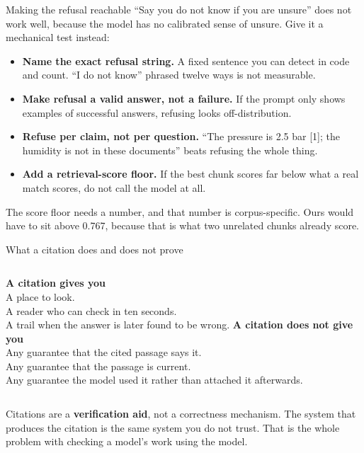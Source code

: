 \documentclass[aspectratio=169]{beamer}
\newcommand{\trapbox}[1]{%
  \begin{tcolorbox}[colback=armred!8, colframe=armred, boxrule=0.6pt, arc=2pt]
  #1
  \end{tcolorbox}}
\newcommand{\watchbox}[1]{%
  \begin{tcolorbox}[colback=armorange!12, colframe=armorange, boxrule=0.6pt, arc=2pt]
  #1
  \end{tcolorbox}}
\begin{document}
\begin{frame}{Making the refusal reachable}
  \vspace{0.3em}
  ``Say you do not know if you are unsure'' does not work well, because the model has no
  calibrated sense of unsure. Give it a mechanical test instead:

  \vspace{0.4em}
  \begin{itemize}
    \item \textbf{Name the exact refusal string.} A fixed sentence you can detect in code
      and count. ``I do not know'' phrased twelve ways is not measurable.
    \item \textbf{Make refusal a valid answer, not a failure.} If the prompt only shows
      examples of successful answers, refusing looks off-distribution.
    \item \textbf{Refuse per claim, not per question.} ``The pressure is 2.5 bar [1]; the
      humidity is not in these documents'' beats refusing the whole thing.
    \item \textbf{Add a retrieval-score floor.} If the best chunk scores far below what a
      real match scores, do not call the model at all.
  \end{itemize}

  \vspace{0.4em}
  \watchbox{The score floor needs a number, and that number is corpus-specific. Ours would
  have to sit above 0.767, because that is what two unrelated chunks already score.}
\end{frame}

\begin{frame}{What a citation does and does not prove}
  \vspace{0.8em}
  \begin{columns}[T]
      \textbf{\color{paramgreen}A citation gives you}\\[0.5em]
      {\small
      A place to look.\\[0.4em]
      A reader who can check in ten seconds.\\[0.4em]
      A trail when the answer is later found to be wrong.}
      \textbf{\color{armred}A citation does not give you}\\[0.5em]
      {\small
      Any guarantee that the cited passage says it.\\[0.4em]
      Any guarantee that the passage is current.\\[0.4em]
      Any guarantee the model used it rather than attached it afterwards.}
  \end{columns}

  \vspace{1.2em}
  \trapbox{Citations are a \textbf{verification aid}, not a correctness mechanism. The
  system that produces the citation is the same system you do not trust. That is the whole
  problem with checking a model's work using the model.}
\end{frame}
\end{document}
